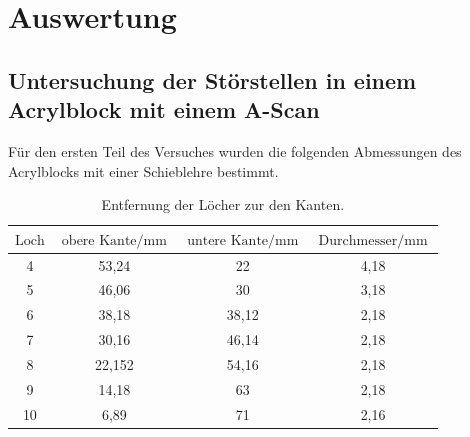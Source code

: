 \section{Auswertung} 

\subsection{Untersuchung der Störstellen in einem Acrylblock mit einem A-Scan}

\begin{flushleft}
    Für den ersten Teil des Versuches wurden die folgenden Abmessungen des Acrylblocks mit einer Schieblehre bestimmt.
\end{flushleft}

\begin{table}[H]
    \centering
    \caption{Entfernung der Löcher zur den Kanten.} 
    \label{Tabelle2}
    \begin{tabular} {c  c  c  c}
        \toprule
        {$ \text{Loch} $} &
        {$ \text{obere Kante} \mathbin{/} \unit{\milli\meter} $} &
        {$ \text{untere Kante} \mathbin{/} \unit{\milli\meter} $} &
        {$ \text{Durchmesser} \mathbin{/} \unit{\milli\meter} $} \\
        \midrule
        4  & 53,24  & 22    & 4,18 \\
        5  & 46,06  & 30    & 3,18 \\
        6  & 38,18  & 38,12 & 2,18 \\
        7  & 30,16  & 46,14 & 2,18 \\
        8  & 22,152 & 54,16 & 2,18 \\
        9  & 14,18  & 63    & 2,18 \\
        10 & 6,89   & 71    & 2,16 \\
        \bottomrule
    \end{tabular} 
\end{table}

